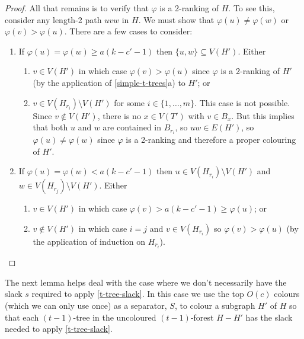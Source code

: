 \documentclass[kpfonts]{patmorin}
\theoremstyle{named}
\newcommand{\weirdref}[2]{\cref{#1}#2}
\begin{document}
\begin{proof}
   All that remains is to verify that $\varphi$ is a 2-ranking of $H$. To see this, consider any length-2 path $uvw$ in $H$.  We must show that $\varphi(u)\neq \varphi(w)$ or $\varphi(v)>\varphi(u)$.  There are a few cases to consider:
   \begin{enumerate}
    \item If $\varphi(u)=\varphi(w) \ge a(k-c'-1)$ then $\{u,w\}\subseteq V(H')$. Either
    \begin{enumerate}
       \item $v\in V(H')$ in which case $\varphi(v)>\varphi(u)$ since $\varphi$ is a 2-ranking of $H'$ (by the application of \weirdref{simple-t-trees}{a}) to $H'$; or
       \item $v\in V(H_{r_i})\setminus V(H')$ for some $i\in\{1,\ldots,m\}$.  This case is not possible.  Since $v\not\in V(H')$, there is no $x\in V(T')$ with $v\in B_x$.  But this implies that both $u$ and $w$ are contained in $B_{r_i}$, so $uw\in E(H')$, so $\varphi(u)\neq\varphi(w)$ since $\varphi$ is a 2-ranking and therefore a proper colouring of $H'$.
   \end{enumerate}
   \item If $\varphi(u)=\varphi(w) < a(k-c'-1)$ then $u\in V(H_{r_i})\setminus V(H')$ and $w\in V(H_{r_j})\setminus V(H')$.  Either
   \begin{enumerate}
    \item $v\in V(H')$ in which case $\varphi(v)>a(k-c'-1)\ge\varphi(u)$; or
    \item $v\not\in V(H')$ in which case $i=j$ and $v\in V(H_{r_i})$ so $\varphi(v)>\varphi(u)$ (by the application of induction on $H_{r_i}$). \qedhere
    \end{enumerate}
   \end{enumerate}
\end{proof}

The next lemma helps deal with the case where we don't necessarily have the slack $s$ required to apply \cref{t-tree-slack}.  In this case we use the top $O(c)$ colours (which we can only use once) as a separator, $S$, to colour a subgraph $H'$ of $H$ so that each $(t-1)$-tree in the uncoloured $(t-1)$-forest $H-H'$ has the slack needed to apply \cref{t-tree-slack}.
\end{document}
